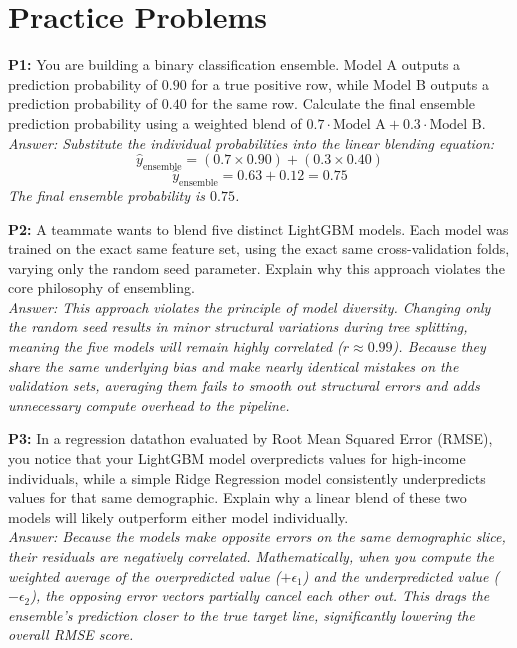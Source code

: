 \documentclass{article}
\begin{document}
\newpage
\section{Practice Problems}

\textbf{P1:} You are building a binary classification ensemble. Model A outputs a prediction probability of $0.90$ for a true positive row, while Model B outputs a prediction probability of $0.40$ for the same row. Calculate the final ensemble prediction probability using a weighted blend of $0.7 \cdot \text{Model A} + 0.3 \cdot \text{Model B}$.
\\
\textit{Answer: Substitute the individual probabilities into the linear blending equation:
\begin{equation*}
    \hat{y}_{\text{ensemble}} = (0.7 \times 0.90) + (0.3 \times 0.40)
\end{equation*}
\begin{equation*}
    \hat{y}_{\text{ensemble}} = 0.63 + 0.12 = 0.75
\end{equation*}
The final ensemble probability is $0.75$.}

\newline
\textbf{P2:} A teammate wants to blend five distinct LightGBM models. Each model was trained on the exact same feature set, using the exact same cross-validation folds, varying only the random seed parameter. Explain why this approach violates the core philosophy of ensembling.
\\
\textit{Answer: This approach violates the principle of model diversity. Changing only the random seed results in minor structural variations during tree splitting, meaning the five models will remain highly correlated ($r \approx 0.99$). Because they share the same underlying bias and make nearly identical mistakes on the validation sets, averaging them fails to smooth out structural errors and adds unnecessary compute overhead to the pipeline.}

\newline
\textbf{P3:} In a regression datathon evaluated by Root Mean Squared Error (RMSE), you notice that your LightGBM model overpredicts values for high-income individuals, while a simple Ridge Regression model consistently underpredicts values for that same demographic. Explain why a linear blend of these two models will likely outperform either model individually.
\\
\textit{Answer: Because the models make opposite errors on the same demographic slice, their residuals are negatively correlated. Mathematically, when you compute the weighted average of the overpredicted value ($+\epsilon_1$) and the underpredicted value ($-\epsilon_2$), the opposing error vectors partially cancel each other out. This drags the ensemble's prediction closer to the true target line, significantly lowering the overall RMSE score.}
\end{document}

